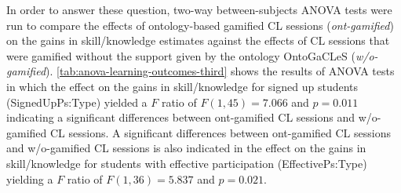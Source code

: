 In order to answer these question, two-way between-subjects ANOVA tests were run to compare the effects of ontology-based gamified CL sessions (\emph{ont-gamified}) on the gains in skill/knowledge estimates against the effects of CL sessions that were gamified without the support given by the ontology OntoGaCLeS (\emph{w/o-gamified}). \autoref{tab:anova-learning-outcomes-third} shows the results of ANOVA tests in which
the effect on the gains in skill/knowledge for signed up students (SignedUpPs:Type) yielded a $F$ ratio of $F(1,45) = 7.066$ and $p = 0.011$ indicating a significant differences between ont-gamified CL sessions and w/o-gamified CL sessions. A significant differences between ont-gamified CL sessions and w/o-gamified CL sessions is also indicated in the effect on the gains in skill/knowledge for students with effective participation (EffectivePs:Type) yielding a $F$ ratio of $F(1,36) = 5.837$ and $p = 0.021$.



